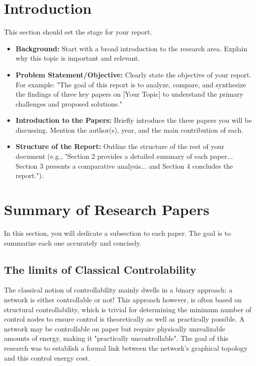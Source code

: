 \documentclass[11pt, a4paper]{article}
\begin{document}
\section{Introduction}
This section should set the stage for your report.
\begin{itemize}
    \item \textbf{Background:} Start with a broad introduction to the research area. Explain why this topic is important and relevant.
    \item \textbf{Problem Statement/Objective:} Clearly state the objective of your report. For example: "The goal of this report is to analyze, compare, and synthesize the findings of three key papers on [Your Topic] to understand the primary challenges and proposed solutions."
    \item \textbf{Introduction to the Papers:} Briefly introduce the three papers you will be discussing. Mention the author(s), year, and the main contribution of each.
    \item \textbf{Structure of the Report:} Outline the structure of the rest of your document (e.g., "Section 2 provides a detailed summary of each paper... Section 3 presents a comparative analysis... and Section 4 concludes the report.").
\end{itemize}

\section{Summary of Research Papers}
In this section, you will dedicate a subsection to each paper. The goal is to summarize each one accurately and concisely.


\subsection{The limits of Classical Controlability}
The classical notion of controllability mainly dwells in a binary approach: a network is either controllable or not! This approach however, is often based on structural controllability, which is trivial for determining the minimum number of control nodes to ensure control is theoretically as well as practically possible. A network may be controllable on paper but require physically unrealizable amounts of energy, making it "practically uncontrollable". The goal of this research was to establish a formal link between the network's graphical topology and this control energy cost.
\end{document}
